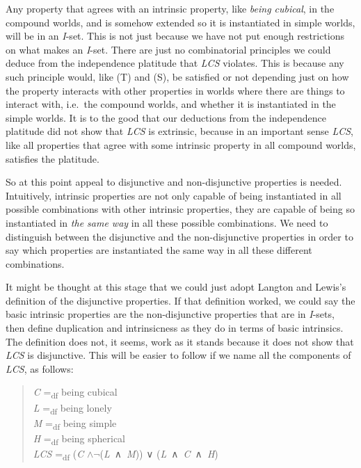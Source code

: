 \documentclass[
  10pt,
  letterpaper,
  DIV=11,
  numbers=noendperiod,
  twoside]{scrartcl}
\begin{document}
Any property that agrees with an intrinsic property, like \emph{being
cubical}, in the compound worlds, and is somehow extended so it is
instantiated in simple worlds, will be in an \emph{I}-set. This is not
just because we have not put enough restrictions on what makes an
\emph{I}-set. There are just no combinatorial principles we could deduce
from the independence platitude that \emph{LCS} violates. This is
because any such principle would, like (T) and (S), be satisfied or not
depending just on how the property interacts with other properties in
worlds where there are things to interact with, i.e.~the compound
worlds, and whether it is instantiated in the simple worlds. It is to
the good that our deductions from the independence platitude did not
show that \emph{LCS} is extrinsic, because in an important sense
\emph{LCS}, like all properties that agree with some intrinsic property
in all compound worlds, satisfies the platitude.

So at this point appeal to disjunctive and non-disjunctive properties is
needed. Intuitively, intrinsic properties are not only capable of being
instantiated in all possible combinations with other intrinsic
properties, they are capable of being so instantiated in \emph{the same
way} in all these possible combinations. We need to distinguish between
the disjunctive and the non-disjunctive properties in order to say which
properties are instantiated the same way in all these different
combinations.

It might be thought at this stage that we could just adopt Langton and
Lewis's definition of the disjunctive properties. If that definition
worked, we could say the basic intrinsic properties are the
non-disjunctive properties that are in \emph{I}-sets, then define
duplication and intrinsicness as they do in terms of basic intrinsics.
The definition does not, it seems, work as it stands because it does not
show that \emph{LCS} is disjunctive. This will be easier to follow if we
name all the components of \emph{LCS}, as follows:

\begin{quote}
\emph{C} =\textsubscript{df} being cubical\\
\emph{L} =\textsubscript{df} being lonely\\
\emph{M} =\textsubscript{df} being simple\\
\emph{H} =\textsubscript{df} being spherical\\
\emph{LCS} =\textsubscript{df} (\emph{C}
\(\wedge \neg\)(\emph{L}~∧~\emph{M})) ∨ (\emph{L}~∧~\emph{C}~∧~\emph{H})
\end{quote}
\end{document}
